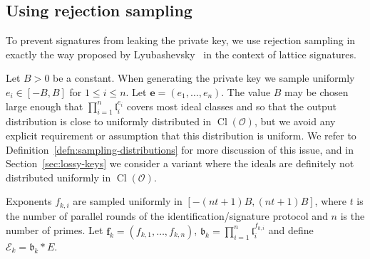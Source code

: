 \documentclass{llncs}
\newcommand{\E}{\mathcal{E}}
\newcommand{\OO}{\mathcal{O}}
\DeclareMathOperator{\Cl}{Cl}
\renewcommand{\a}{\mathfrak{a}}
\renewcommand{\b}{\mathfrak{b}}
\renewcommand{\l}{\mathfrak{l}}
\newcommand{\e}{\mathbf{e}}
\newcommand{\f}{\mathbf{f}}
\begin{document}
%





\subsection{Using rejection sampling}\label{sec:sig-reject-sample}

To prevent signatures from leaking the private key, we use rejection sampling in exactly the way proposed by Lyubashevsky~\cite{Lyu09} in the context of lattice signatures.

Let $B > 0$ be a constant. When generating the private key we sample uniformly $e_i \in [-B, B]$ for $1 \le i \le n$. Let $\e = ( e_1, \dots, e_n )$.
The value $B$ may be chosen large enough that $\prod_{i=1}^n \l_i^{e_i}$ covers most ideal classes and so that the output distribution is close to uniformly distributed in $\Cl(\OO)$, but we avoid any explicit requirement or assumption that this distribution is uniform.
We refer to Definition~\ref{defn:sampling-distributions} for more discussion of this issue, and in Section~\ref{sec:lossy-keys} we consider a variant where the ideals are definitely not distributed uniformly in $\Cl(\OO)$.

Exponents $f_{k,i}$ are sampled uniformly in $[-(nt+1)B, (nt+1)B]$, where $t$ is the number of parallel rounds of the identification/signature protocol and $n$ is the number of primes.
Let $\f_k = (f_{k,1}, \dots, f_{k,n} )$, $\b_k = \prod_{i=1}^n \l_i^{f_{k,i}}$ and define $\E_k = \b_k * E $.
\end{document}
